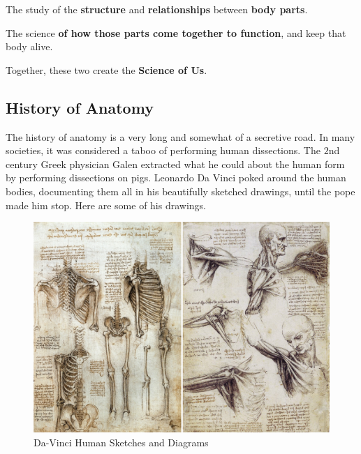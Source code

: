 \label{les_1:introduction_to_anatomay_and_physiology}

\begin{definition}[Anatomy]
	\label{def:anatomy}

	The study of the \textbf{structure} and \textbf{relationships} between
	\textbf{body parts}.
\end{definition}

\begin{definition}[Physiology]
	\label{def:physiology}

	The science \textbf{of how those parts come together to function}, and keep
	that body alive.
\end{definition}

Together, these two create the \textbf{Science of Us}.

\subsection*{History of Anatomy}
\label{sub_sec:history_of_anatomy}

The history of anatomy is a very long and somewhat of a secretive road. In many
societies, it was considered a taboo of performing human dissections. The $2$nd
century Greek physician Galen extracted what he could about the human form by
performing dissections on pigs. Leonardo Da Vinci poked around the human
bodies, documenting them all in his beautifully sketched drawings, until the
pope made him stop. Here are some of his drawings.

\begin{figure}[H]
	\centering
	\includegraphics[width=1\textwidth]{img/da-vinci-human-drawings}
	\caption{Da-Vinci Human Sketches and Diagrams}
	\label{fig:da_vinci_human_sketches_and_diagrams}
\end{figure}

